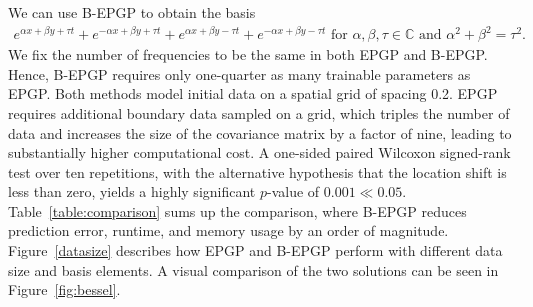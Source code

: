 \documentclass{article} %
\theoremstyle{plain}
\theoremstyle{definition}
\theoremstyle{remark}
\newcommand{\CC}{\mathbb{C}}
\begin{document}
We can use B-EPGP to obtain the basis
\begin{align*}
e^{\alpha x+\beta y+\tau t}+e^{-\alpha x+\beta y+\tau t}
+e^{\alpha x+\beta y-\tau t}+e^{-\alpha x+\beta y-\tau t}\text{ for $\alpha,\beta,\tau\in\CC$ and $\alpha^2+\beta^2=\tau^2$.}
\end{align*}
We fix the number of frequencies to be the same in both EPGP and B-EPGP. Hence, B-EPGP requires only one-quarter as many trainable parameters as EPGP. Both methods model initial data on a spatial grid of spacing 0.2. EPGP requires additional boundary data sampled on a grid, which triples the number of data and increases the size of the covariance matrix by a factor of nine, leading to substantially higher computational cost. A one-sided paired Wilcoxon signed-rank test over ten repetitions, with the alternative hypothesis that the location shift is less than zero, yields a highly significant $p$-value of $0.001 \ll 0.05$. Table~\ref{table:comparison} sums up the comparison, where B-EPGP reduces prediction error, runtime, and memory usage by an order of magnitude. Figure~\ref{datasize} describes how EPGP and B-EPGP perform with different data size and basis elements. A visual comparison of the two solutions can be seen in Figure~\ref{fig:bessel}. 
\end{document}
